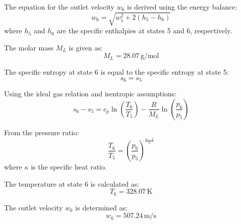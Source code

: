 The equation for the outlet velocity \( w_6 \) is derived using the energy balance:  
\[
w_6 = \sqrt{w_5^2 + 2(h_5 - h_6)}
\]  
where \( h_5 \) and \( h_6 \) are the specific enthalpies at states 5 and 6, respectively.  

The molar mass \( M_L \) is given as:  
\[
M_L = 28.07 \, \text{g/mol}
\]  

The specific entropy at state 6 is equal to the specific entropy at state 5:  
\[
s_6 = s_5
\]  

Using the ideal gas relation and isentropic assumptions:  
\[
s_6 - s_5 = c_p \ln \left( \frac{T_6}{T_5} \right) - \frac{R}{M_L} \ln \left( \frac{p_6}{p_5} \right)
\]  

From the pressure ratio:  
\[
\frac{T_6}{T_5} = \left( \frac{p_6}{p_5} \right)^{\frac{\kappa - 1}{\kappa}}
\]  
where \( \kappa \) is the specific heat ratio.  

The temperature at state 6 is calculated as:  
\[
T_6 = 328.07 \, \text{K}
\]  

The outlet velocity \( w_6 \) is determined as:  
\[
w_6 = 507.24 \, \text{m/s}
\]
